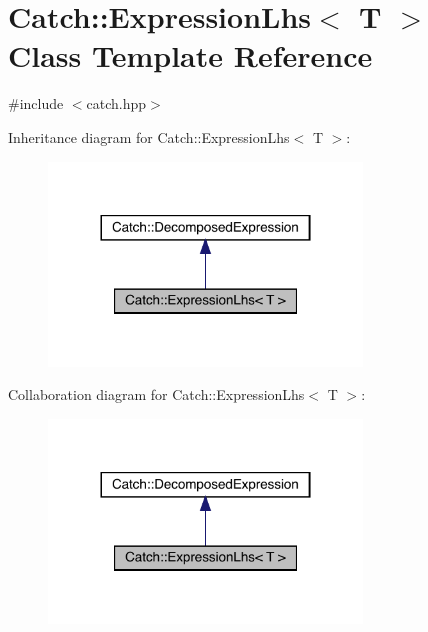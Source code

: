 \hypertarget{class_catch_1_1_expression_lhs}{}\section{Catch\+:\+:Expression\+Lhs$<$ T $>$ Class Template Reference}
\label{class_catch_1_1_expression_lhs}


{\ttfamily \#include $<$catch.\+hpp$>$}



Inheritance diagram for Catch\+:\+:Expression\+Lhs$<$ T $>$\+:
\nopagebreak
\begin{figure}[H]
\begin{center}
\leavevmode
\includegraphics[width=236pt]{class_catch_1_1_expression_lhs__inherit__graph}
\end{center}
\end{figure}


Collaboration diagram for Catch\+:\+:Expression\+Lhs$<$ T $>$\+:
\nopagebreak
\begin{figure}[H]
\begin{center}
\leavevmode
\includegraphics[width=236pt]{class_catch_1_1_expression_lhs__coll__graph}
\end{center}
\end{figure}
